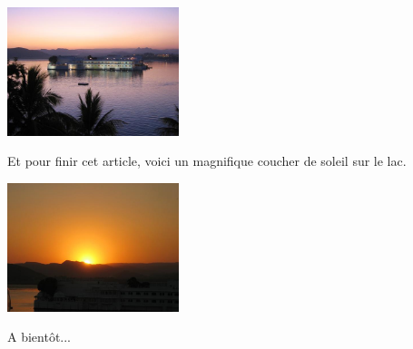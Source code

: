 \begin{multicols}{2}
\smallbreak
\hspace*{-0.65cm}
\includegraphics[width=5cm]{articles/Octopussy/octopussy.jpg}
\smallbreak

Et pour finir cet article, voici un magnifique coucher de soleil sur le lac.

\smallbreak
\hspace*{-0.65cm}
\includegraphics[width=5cm]{articles/Octopussy/soleil.jpg}
\smallbreak

A bientôt...

\end{multicols}


